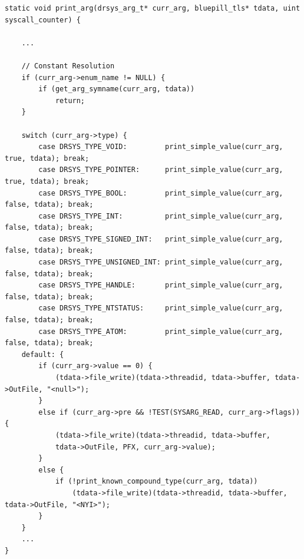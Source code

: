 \vspace{1em}
\begin{lstlisting}[caption={\texttt{print\_arg} function},captionpos=b]
static void print_arg(drsys_arg_t* curr_arg, bluepill_tls* tdata, uint syscall_counter) {

	...

	// Constant Resolution
	if (curr_arg->enum_name != NULL) {
		if (get_arg_symname(curr_arg, tdata))
			return;
	}

	switch (curr_arg->type) {
		case DRSYS_TYPE_VOID:	      print_simple_value(curr_arg, true, tdata); break;
		case DRSYS_TYPE_POINTER:      print_simple_value(curr_arg, true, tdata); break;
		case DRSYS_TYPE_BOOL:         print_simple_value(curr_arg, false, tdata); break;
		case DRSYS_TYPE_INT:          print_simple_value(curr_arg, false, tdata); break;
		case DRSYS_TYPE_SIGNED_INT:   print_simple_value(curr_arg, false, tdata); break;
		case DRSYS_TYPE_UNSIGNED_INT: print_simple_value(curr_arg, false, tdata); break;
		case DRSYS_TYPE_HANDLE:       print_simple_value(curr_arg, false, tdata); break;
		case DRSYS_TYPE_NTSTATUS:     print_simple_value(curr_arg, false, tdata); break;
		case DRSYS_TYPE_ATOM:         print_simple_value(curr_arg, false, tdata); break;
	default: {
		if (curr_arg->value == 0) {
			(tdata->file_write)(tdata->threadid, tdata->buffer, tdata->OutFile, "<null>");
		}
		else if (curr_arg->pre && !TEST(SYSARG_READ, curr_arg->flags)) {
			(tdata->file_write)(tdata->threadid, tdata->buffer,
			tdata->OutFile, PFX, curr_arg->value);
		}
		else {
			if (!print_known_compound_type(curr_arg, tdata))
				(tdata->file_write)(tdata->threadid, tdata->buffer, tdata->OutFile, "<NYI>");
		}
	}
	...
}
\end{lstlisting}

